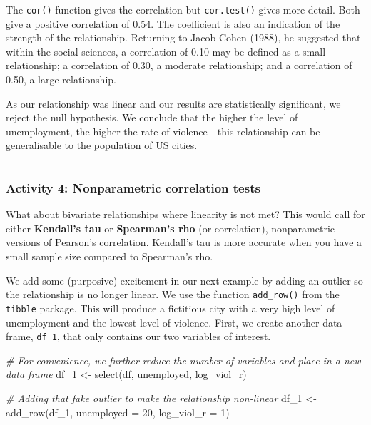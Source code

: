 \documentclass[
]{book}
\newenvironment{Shaded}{\begin{snugshade}}{\end{snugshade}}
\newcommand{\AttributeTok}[1]{\textcolor[rgb]{0.77,0.63,0.00}{#1}}
\newcommand{\CommentTok}[1]{\textcolor[rgb]{0.56,0.35,0.01}{\textit{#1}}}
\newcommand{\DecValTok}[1]{\textcolor[rgb]{0.00,0.00,0.81}{#1}}
\newcommand{\FunctionTok}[1]{\textcolor[rgb]{0.00,0.00,0.00}{#1}}
\newcommand{\NormalTok}[1]{#1}
\newcommand{\OtherTok}[1]{\textcolor[rgb]{0.56,0.35,0.01}{#1}}
\begin{document}
The \texttt{cor()} function gives the correlation but \texttt{cor.test()} gives more detail. Both give a positive correlation of 0.54. The coefficient is also an indication of the strength of the relationship. Returning to Jacob Cohen (1988), he suggested that within the social sciences, a correlation of 0.10 may be defined as a small relationship; a correlation of 0.30, a moderate relationship; and a correlation of 0.50, a large relationship.

As our relationship was linear and our results are statistically significant, we reject the null hypothesis. We conclude that the higher the level of unemployment, the higher the rate of violence - this relationship can be generalisable to the population of US cities.

\begin{center}\rule{0.5\linewidth}{0.5pt}\end{center}

\hypertarget{activity-4-nonparametric-correlation-tests}{%
\subsubsection{Activity 4: Nonparametric correlation tests}\label{activity-4-nonparametric-correlation-tests}}

What about bivariate relationships where linearity is not met? This would call for either \textbf{Kendall's tau} or \textbf{Spearman's rho} (or correlation), nonparametric versions of Pearson's correlation. Kendall's tau is more accurate when you have a small sample size compared to Spearman's rho.

We add some (purposive) excitement in our next example by adding an outlier so the relationship is no longer linear. We use the function \texttt{add\_row()} from the \texttt{tibble} package. This will produce a fictitious city with a very high level of unemployment and the lowest level of violence. First, we create another data frame, \texttt{df\_1}, that only contains our two variables of interest.

\begin{Shaded}
\begin{Highlighting}[]
\CommentTok{\# For convenience, we further reduce the number of variables and place in a new data frame}
\NormalTok{df\_1 }\OtherTok{\textless{}{-}} \FunctionTok{select}\NormalTok{(df, unemployed, log\_viol\_r) }

\CommentTok{\# Adding that fake outlier to make the relationship non{-}linear}
\NormalTok{df\_1 }\OtherTok{\textless{}{-}} \FunctionTok{add\_row}\NormalTok{(df\_1, }\AttributeTok{unemployed =} \DecValTok{20}\NormalTok{, }\AttributeTok{log\_viol\_r =} \DecValTok{1}\NormalTok{)}
\end{Highlighting}
\end{Shaded}
\end{document}
